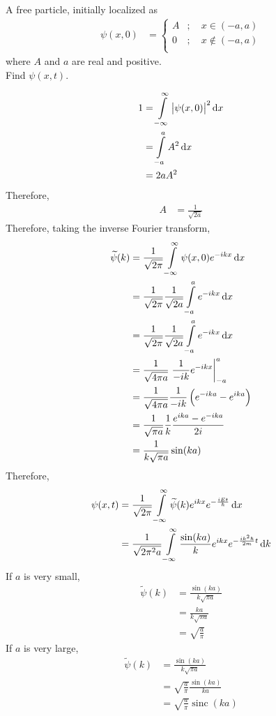 \documentclass[titlepage, fleqn, a4paper, 12pt, twoside]{article}
\theoremstyle{definition}
\theoremstyle{theorem}
\DeclareMathOperator{\sinc}{sinc}
\renewcommand{\tilde}{\widetilde}
\begin{document}
\begin{question}
	A free particle, initially localized as
	\begin{align*}
		\psi(x,0) &=
			\begin{cases}
				A &;\quad x \in (-a,a)\\
				0 &;\quad x \notin (-a,a)\\
			\end{cases}
	\end{align*}
	where $A$ and $a$ are real and positive.\\
	Find $\psi(x,t)$.
\end{question}

\begin{solution}
	\begin{align*}
		1 &= \int\limits_{-\infty}^{\infty} \left| \psi(x,0) \right|^2 \dif x\\
		&= \int\limits_{-a}^{a} A^2 \dif x\\
		&= 2 a A^2
	\end{align*}
	Therefore,
	\begin{align*}
		A &= \frac{1}{\sqrt{2 a}}
	\end{align*}
	Therefore, taking the inverse Fourier transform,
	\begin{align*}
		\tilde{\psi}(k) &= \frac{1}{\sqrt{2 \pi}} \int\limits_{-\infty}^{\infty} \psi(x,0) e^{-i k x} \dif x\\
		&= \frac{1}{\sqrt{2 \pi}} \frac{1}{\sqrt{2 a}} \int\limits_{-a}^{a} e^{-i k x} \dif x\\
		&= \frac{1}{\sqrt{2 \pi}} \frac{1}{\sqrt{2 a}} \int\limits_{-a}^{a} e^{-i k x} \dif x\\
		&= \frac{1}{\sqrt{4 \pi a}} \left. \frac{1}{-i k} e^{-i k x} \right|_{-a}^{a}\\
		&= \frac{1}{\sqrt{4 \pi a}} \frac{1}{-i k} \left( e^{-i k a} - e^{i k a} \right)\\
		&= \frac{1}{\sqrt{\pi a}} \frac{1}{k} \frac{e^{i k a} - e^{-i k a}}{2 i}\\
		&= \frac{1}{k \sqrt{\pi a}} \sin(k a)
	\end{align*}
	Therefore,
	\begin{align*}
		\psi(x,t) &= \frac{1}{\sqrt{2 \pi}} \int\limits_{-\infty}^{\infty} \tilde{\psi}(k) e^{i k x} e^{-\frac{i E t}{\hbar}} \dif x\\
		&= \frac{1}{\sqrt{2 \pi^2 a}} \int\limits_{-\infty}^{\infty} \frac{\sin(k a)}{k} e^{i k x} e^{-\frac{i k^2 \hbar}{2 m} t} \dif k
	\end{align*}
	If $a$ is very small,
	\begin{align*}
		\tilde{\psi}(k) &= \frac{\sin(k a)}{k \sqrt{\pi a}}\\
		&= \frac{k a}{k \sqrt{\pi a}}\\
		&= \sqrt{\frac{a}{\pi}}
	\end{align*}
	If $a$ is very large,
	\begin{align*}
		\tilde{\psi}(k) &= \frac{\sin(k a)}{k \sqrt{\pi a}}\\
		&= \sqrt{\frac{a}{\pi}} \frac{\sin(k a)}{k a}\\
		&= \sqrt{\frac{a}{\pi}} \sinc(k a)
	\end{align*}
\end{solution}
\end{document}
